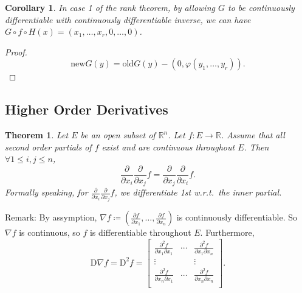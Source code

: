 \documentclass[12pt]{article}
\theoremstyle{plain}
\newtheorem{thm}{Theorem}
\newtheorem*{corollary}{Corollary}
\theoremstyle{definition}
\begin{document}
\begin{corollary}
    In case 1 of the rank theorem, by allowing $G$ to be continuously differentiable with continuously differentiable inverse, we can have
    $G\circ f\circ H(x) = (x_1,\ldots,x_r,0,\ldots,0)$.
\end{corollary}
\begin{proof}
    \[
        \text{new} G(y) = \text{old}G(y) - (0,\varphi(y_1,\ldots,y_r)).
    \]
\end{proof}

\subsection*{Higher Order Derivatives}
\begin{thm}
    Let $E$ be an open subset of $\mathbb{R}^n$.
    Let $f:E\rightarrow\mathbb{R}$.
    Assume that all second order partials of $f$ exist and are continuous throughout $E$.
    Then $\forall 1\leq i, j\leq n$,
    \[
        \frac{\partial}{\partial x_i}\frac{\partial}{\partial x_j}f = \frac{\partial}{\partial x_j}\frac{\partial}{\partial x_i}f.
    \]
    Formally speaking, for $\frac{\partial}{\partial x_i}\frac{\partial}{\partial x_j}f$, we differentiate 1st w.r.t.\ the inner partial.
\end{thm}
Remark: By assymption, $\nabla f\coloneqq(\frac{\partial f}{\partial x_1},\ldots, \frac{\partial f}{\partial x_n})$ is continuously differentiable.
So $\nabla f$ is continuous, so $f$ is differentiable throughout $E$.
Furthermore, 
\[
    \mathrm{D}\nabla f = \mathrm{D}^2f = 
    \begin{bmatrix}
        \frac{\partial^2 f}{\partial x_1 \partial x_1} & \cdots &\frac{\partial^2f}{\partial x_1 \partial x_n}\\
        \vdots&&\vdots\\
        \frac{\partial^2 f}{\partial x_n \partial x_1} & \cdots &\frac{\partial^2f}{\partial x_n \partial x_n}\\
    \end{bmatrix}.
\]
\end{document}
